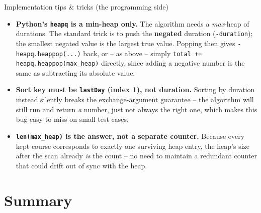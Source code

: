 \documentclass[11pt,aspectratio=169]{beamer}
\begin{document}
\begin{frame}{Implementation tips \& tricks (the programming side)}
  \small
  \begin{itemize}
    \item \textbf{Python's \texttt{heapq} is a min-heap only.} The algorithm needs a
    \emph{max}-heap of durations. The standard trick is to push the
    \textbf{negated} duration (\texttt{-duration}); the smallest negated value is the
    largest true value. Popping then gives \texttt{-heapq.heappop(...)} back, or --
    as above -- simply \texttt{total += heapq.heappop(max\_heap)} directly, since
    adding a negative number is the same as subtracting its absolute value.
    \item \textbf{Sort key must be \texttt{lastDay} (index 1), not duration.} Sorting
    by duration instead silently breaks the exchange-argument guarantee -- the
    algorithm will still run and return \emph{a} number, just not always the right
    one, which makes this bug easy to miss on small test cases.
    \item \textbf{\texttt{len(max\_heap)} is the answer, not a separate counter.}
    Because every kept course corresponds to exactly one surviving heap entry, the
    heap's size after the scan already \emph{is} the count -- no need to maintain a
    redundant counter that could drift out of sync with the heap.
  \end{itemize}
\end{frame}

\section{Summary}
\end{document}
